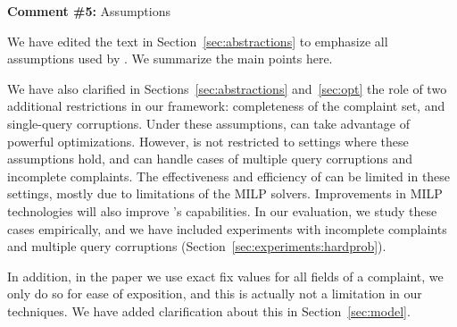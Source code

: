 \comskip

\noindent
\textbf{Comment \#5:} Assumptions
\begin{quote}
\end{quote}

We have edited the text in Section~\ref{sec:abstractions} to emphasize all assumptions used by \sys.  We summarize the main points here.

We have also clarified in Sections~\ref{sec:abstractions} and~\ref{sec:opt}
the role of two additional restrictions in our framework: completeness of the
complaint set, and single-query corruptions. Under these assumptions, \sys can
take advantage of powerful optimizations. However, \sys is not restricted to
settings where these assumptions hold, and can handle cases of multiple query
corruptions and incomplete complaints. The effectiveness and efficiency of
\sys can be limited in these settings, mostly due to limitations of the MILP
solvers. Improvements in MILP technologies will also improve \sys's
capabilities. In our evaluation, we study these cases empirically, and we have
included experiments with incomplete complaints and multiple query corruptions
(Section~\ref{sec:experiments:hardprob}).

In addition, in the paper we use exact fix values for all fields of a complaint, we
only do so for ease of exposition, and this is actually not a limitation in
our techniques. We have added clarification about this in
Section~\ref{sec:model}.



\comskip